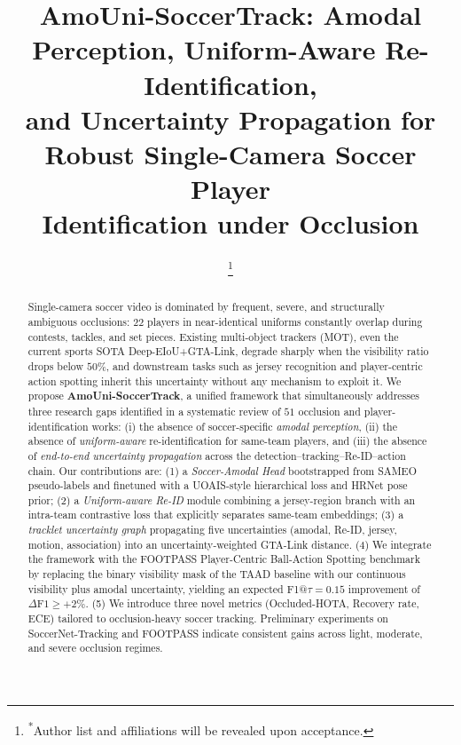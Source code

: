 \documentclass[conference]{IEEEtran}
\begin{document}
\title{AmoUni-SoccerTrack: Amodal Perception, Uniform-Aware Re-Identification,\\ and Uncertainty Propagation for Robust Single-Camera Soccer Player\\ Identification under Occlusion}

\author{
\thanks{\textsuperscript{*}Author list and affiliations will be revealed upon acceptance.}
}

\maketitle

\begin{abstract}
Single-camera soccer video is dominated by frequent, severe, and structurally ambiguous occlusions: $22$ players in near-identical uniforms constantly overlap during contests, tackles, and set pieces. Existing multi-object trackers (MOT), even the current sports SOTA Deep-EIoU+GTA-Link, degrade sharply when the visibility ratio drops below $50\%$, and downstream tasks such as jersey recognition and player-centric action spotting inherit this uncertainty without any mechanism to exploit it. We propose \textbf{AmoUni-SoccerTrack}, a unified framework that simultaneously addresses three research gaps identified in a systematic review of $51$ occlusion and player-identification works: (i) the absence of soccer-specific \emph{amodal perception}, (ii) the absence of \emph{uniform-aware} re-identification for same-team players, and (iii) the absence of \emph{end-to-end uncertainty propagation} across the detection--tracking--Re-ID--action chain. Our contributions are: (1) a \emph{Soccer-Amodal Head} bootstrapped from SAMEO pseudo-labels and finetuned with a UOAIS-style hierarchical loss and HRNet pose prior; (2) a \emph{Uniform-aware Re-ID} module combining a jersey-region branch with an intra-team contrastive loss that explicitly separates same-team embeddings; (3) a \emph{tracklet uncertainty graph} propagating five uncertainties (amodal, Re-ID, jersey, motion, association) into an uncertainty-weighted GTA-Link distance. (4) We integrate the framework with the FOOTPASS Player-Centric Ball-Action Spotting benchmark by replacing the binary visibility mask of the TAAD baseline with our continuous visibility plus amodal uncertainty, yielding an expected F1@$\tau=0.15$ improvement of $\Delta\text{F1} \geq +2\%$. (5) We introduce three novel metrics (Occluded-HOTA, Recovery rate, ECE) tailored to occlusion-heavy soccer tracking. Preliminary experiments on SoccerNet-Tracking and FOOTPASS indicate consistent gains across light, moderate, and severe occlusion regimes.
\end{abstract}
\end{document}
